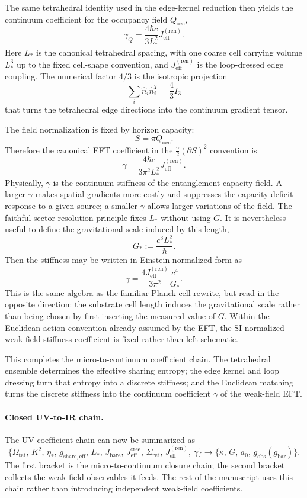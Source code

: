 \documentclass[11pt]{article}
\begin{document}
The same tetrahedral identity used in the edge-kernel reduction then yields the continuum coefficient for the occupancy field $Q_{\mathrm{occ}}$,
\[
\gamma_Q=\frac{4\hbar c}{3L_*^2}J_{\mathrm{eff}}^{(\mathrm{ren})}.
\]
Here $L_*$ is the canonical tetrahedral spacing, with one coarse cell carrying volume $L_*^3$ up to the fixed cell-shape convention, and $J_{\mathrm{eff}}^{(\mathrm{ren})}$ is the loop-dressed edge coupling. The numerical factor $4/3$ is the isotropic projection
\[
\sum_i \hat n_i\hat n_i^T=\frac43 I_3
\]
that turns the tetrahedral edge directions into the continuum gradient tensor.

The field normalization is fixed by horizon capacity:
\[
S=\pi Q_{\mathrm{occ}}.
\]
Therefore the canonical EFT coefficient in the $\frac{\gamma}{2}(\partial S)^2$ convention is
\[
\gamma=\frac{4\hbar c}{3\pi^2L_*^2}J_{\mathrm{eff}}^{(\mathrm{ren})}.
\]
Physically, $\gamma$ is the continuum stiffness of the entanglement-capacity field. A larger $\gamma$ makes spatial gradients more costly and suppresses the capacity-deficit response to a given source; a smaller $\gamma$ allows larger variations of the field.
The faithful sector-resolution principle fixes $L_*$ without using $G$. It is nevertheless useful to define the gravitational scale induced by this length,
\[
G_*:=\frac{c^3L_*^2}{\hbar}.
\]
Then the stiffness may be written in Einstein-normalized form as
\[
\gamma=\frac{4J_{\mathrm{eff}}^{(\mathrm{ren})}}{3\pi^2}\frac{c^4}{G_*}.
\]
This is the same algebra as the familiar Planck-cell rewrite, but read in the opposite direction: the substrate cell length induces the gravitational scale rather than being chosen by first inserting the measured value of $G$. Within the Euclidean-action convention already assumed by the EFT, the SI-normalized weak-field stiffness coefficient is fixed rather than left schematic.

This completes the micro-to-continuum coefficient chain. The tetrahedral ensemble determines the effective sharing entropy; the edge kernel and loop dressing turn that entropy into a discrete stiffness; and the Euclidean matching turns the discrete stiffness into the continuum coefficient $\gamma$ of the weak-field EFT.

\paragraph{Closed UV-to-IR chain.}
The UV coefficient chain can now be summarized as
\[
\{\Omega_{\mathrm{tet}},\,K^2,\,\eta_*,\,g_{\mathrm{share,eff}},\,L_*,\,J_{\mathrm{bare}},\,J_{\mathrm{eff}}^{\mathrm{tree}},\,\Sigma_{\mathrm{ret}},\,J_{\mathrm{eff}}^{(\mathrm{ren})},\,\gamma\}
\longrightarrow
\{\kappa,\,G,\,a_0,\,g_{\mathrm{obs}}(g_{\mathrm{bar}})\}.
\]
The first bracket is the micro-to-continuum closure chain; the second bracket collects the weak-field observables it feeds. The rest of the manuscript uses this chain rather than introducing independent weak-field coefficients.
\end{document}
